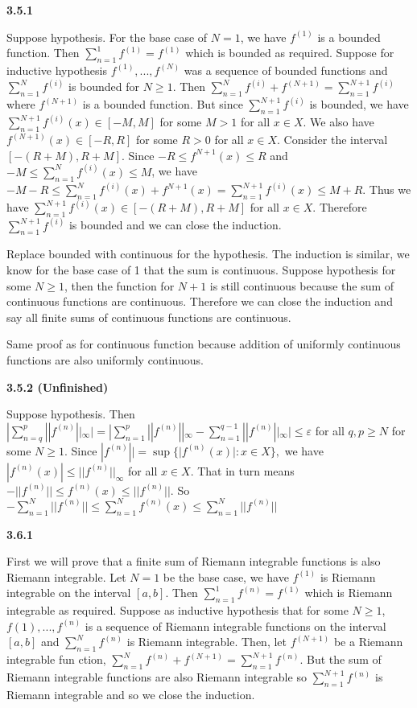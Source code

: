 \documentclass[12pt]{article}
\begin{document}
\textbf{3.5.1}

Suppose hypothesis. For the base case of $N=1$, we have $f^{(1)}$ is a bounded function. Then $\sum_{n=1}^1f^{(1)} = f^{(1)} $ which is bounded as required. Suppose for inductive hypothesis $f^{(1)},..., f^{(N)}$ was a sequence of bounded functions and $\sum_{n=1}^Nf^{(i)}$ is bounded for $N\geq 1$. Then $\sum_{n=1}^Nf^{(i)} + f^{(N+1)} = \sum_{n=1}^{N+1}f^{(i)}$ where $f^{(N+1)}$ is a bounded function. But since $\sum_{n=1}^{N+1}f^{(i)}$ is bounded, we have $\sum_{n=1}^{N+1}f^{(i)} (x)\in [-M,M]$ for some $M> 1$ for all $x\in X$. We also have $f^{(N+1)}(x)\in [-R,R]$ for some $R> 0$ for all $x\in X$. Consider the interval $[-(R+M), R+M]$. Since $ -R\leq f^{N+1}(x)\leq R$ and $-M\leq \sum_{n=1}^Nf^{(i)}(x) \leq M$, we have $-M-R\leq\sum_{n=1}^Nf^{(i)}(x)+f^{N+1}(x) = \sum_{n=1}^{N+1}f^{(i)} (x)\leq M +R$. Thus we have $\sum_{n=1}^{N+1}f^{(i)} (x)\in [-(R+M), R+M]$ for all $x\in X$. Therefore $\sum_{n=1}^{N+1}f^{(i)}$ is bounded and we can close the induction. 

Replace bounded with continuous for the hypothesis. The induction is similar, we know for the base case of 1 that the sum is continuous. Suppose hypothesis for some $N\geq 1$, then the function for $N+1$ is still continuous because the sum of continuous functions are continuous. Therefore we can close the induction and say all finite sums of continuous functions are continuous. 

Same proof as for continuous function because addition of uniformly continuous functions are also uniformly continuous.

\textbf{3.5.2 (Unfinished)}

Suppose hypothesis. Then $|\sum_{n=q}^p||f^{(n)}||_{\infty}|  = |\sum_{n=1}^p||f^{(n)}||_{\infty}- \sum_{n=1}^{q-1}||f^{(n)}||_{\infty}|\leq \varepsilon$ for all $q,p\geq N$ for some $N\geq 1$.  Since $|f^{(n)}|| = \sup\{|f^{(n)}(x)|: x\in X\},$ we have $  |f^{(n)}(x)|\leq  ||f^{(n)}||_{\infty} $ for all $x\in X$. That in turn means $-||f^{(n)}||\leq f^{(n)}(x)\leq ||f^{(n)}|| $. So $-\sum_{n=1}^N||f^{(n)}||\leq \sum_{n=1}^Nf^{(n)}(x)\leq \sum_{n=1}^N||f^{(n)}||$   

\textbf{3.6.1}

First we will prove that a finite sum of Riemann integrable functions is also Riemann integrable. Let $N=1$ be the base case, we have $f^{(1)}$ is Riemann integrable on the interval $[a,b]$. Then $\sum_{n=1}^1f^{(n)} = f^{(1)}$ which is Riemann integrable as required. Suppose as inductive hypothesis that for some $N\geq 1$, $f{(1)},... ,f^{(n)}$ is a sequence of Riemann integrable functions on the interval $[a,b]$ and $\sum_{n=1}^Nf^{(n)}$ is Riemann integrable. Then, let $f^{(N+1)}$ be a Riemann integrable fun        ction, $\sum_{n=1}^Nf^{(n)} +f^{(N+1)}  = \sum_{n=1}^{N+1}f^{(n)}$. But the sum of Riemann integrable functions are also Riemann integrable so $\sum_{n=1}^{N+1}f^{(n)} $ is Riemann integrable and so we close the induction.
\end{document}
